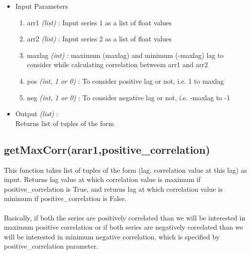 \begin{itemize}
 \item Input Parameters
 
 \begin{enumerate}
  \item arr1 \textit{(list)} : Input series 1 as a list of float values
  \item arr2 \textit{(list)} : Input series 2 as a list of float values
  \item maxlag \textit{(int)} : maximum (maxlag) and minimum (-maxlag) lag to 
consider while calculating correlation betweem arr1 and arr2
  \item pos \textit{(int, 1 or 0)} : To consider positive lag or not, i.e. 1 to 
maxlag
  \item neg \textit{(int, 1 or 0)} : To consider negative lag or not, i.e. 
-maxlag to -1
 \end{enumerate}

 \item Output \textit{(list)} : \\
  Returns list of tuples of the form \\
 
\end{itemize}

\subsection{getMaxCorr(arar1,positive\_correlation)}

This function takes list of tuples of the form (lag, correlation value at this 
lag) as  input. Returns lag value at which correlation value is maximum if 
positive\_correlation is True, and returns lag at which correlation value is 
minimum if positive\_correlation is False. \\
\\
Basically, if both the series are positively correlated than we will be 
interested in maximum positive correlation or if both series are negatively 
correlated than we will be interested in minimum negative correlation, which is 
specified by positive\_correlation parameter.

